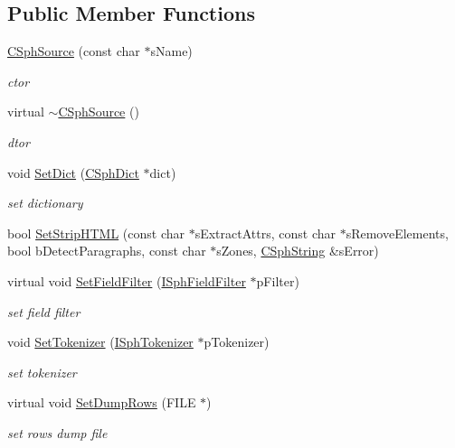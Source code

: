 \subsection*{Public Member Functions}
\begin{DoxyCompactItemize}
\item 
\hyperlink{classCSphSource_a2dcccbeef027aa1164910604cbc3e6a1}{C\-Sph\-Source} (const char $\ast$s\-Name)
\begin{DoxyCompactList}\small\item\em ctor \end{DoxyCompactList}\item 
virtual \hyperlink{classCSphSource_afe6bc4ddc5d26b782965df6ec73bc9f6}{$\sim$\-C\-Sph\-Source} ()
\begin{DoxyCompactList}\small\item\em dtor \end{DoxyCompactList}\item 
void \hyperlink{classCSphSource_abd6fcc5464a2a98ee9503fa8bce5dbf8}{Set\-Dict} (\hyperlink{classCSphDict}{C\-Sph\-Dict} $\ast$dict)
\begin{DoxyCompactList}\small\item\em set dictionary \end{DoxyCompactList}\item 
bool \hyperlink{classCSphSource_a08d22bb059b11265de6c50bdb21197df}{Set\-Strip\-H\-T\-M\-L} (const char $\ast$s\-Extract\-Attrs, const char $\ast$s\-Remove\-Elements, bool b\-Detect\-Paragraphs, const char $\ast$s\-Zones, \hyperlink{structCSphString}{C\-Sph\-String} \&s\-Error)
\item 
virtual void \hyperlink{classCSphSource_aef881601e2db370b530a2895fece8aaf}{Set\-Field\-Filter} (\hyperlink{classISphFieldFilter}{I\-Sph\-Field\-Filter} $\ast$p\-Filter)
\begin{DoxyCompactList}\small\item\em set field filter \end{DoxyCompactList}\item 
void \hyperlink{classCSphSource_ab21105df5032913c9a3b4345b23f1c86}{Set\-Tokenizer} (\hyperlink{classISphTokenizer}{I\-Sph\-Tokenizer} $\ast$p\-Tokenizer)
\begin{DoxyCompactList}\small\item\em set tokenizer \end{DoxyCompactList}\item 
virtual void \hyperlink{classCSphSource_a7f2d4143bfbca9935db7b1a32a652103}{Set\-Dump\-Rows} (F\-I\-L\-E $\ast$)
\begin{DoxyCompactList}\small\item\em set rows dump file \end{DoxyCompactList}\item 

\end{DoxyCompactItemize}
